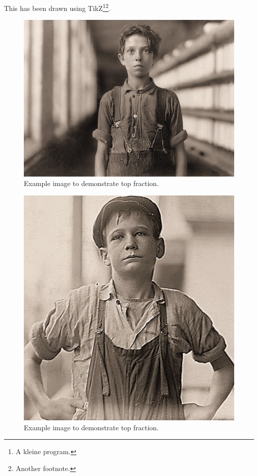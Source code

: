 \documentclass[twoside,twocolumn]{book}
\begin{document}
This has been drawn using TikZ\footnote{A kleine program.}\footnote{Another footnote.}.
\lipsum[1-2]
\begin{figure}[tpb]
\centering
\includegraphics[width=\columnwidth]{./chapters/hine02}
\caption{Example image to demonstrate top fraction.}
\end{figure}
\begin{figure}[tpb]
\centering
\includegraphics[height=\columnwidth]{./chapters/hine04-x}
\caption{Example image to demonstrate top fraction.}
\end{figure}
\end{document}
